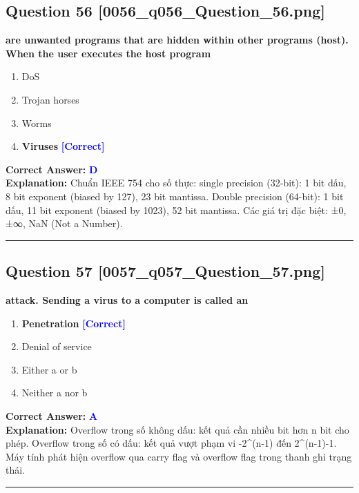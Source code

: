 \documentclass[11pt,a4paper]{article}
\begin{document}
\begin{minipage}{\textwidth}
\subsection*{Question 56 \quad \footnotesize{[0056\_q056\_Question\_56.png]}}
\noindent \textbf{are unwanted programs that are hidden within other programs (host). When the user executes the host program}

\begin{enumerate}[label=\Alph*.]
    \item DoS
    \item Trojan horses
    \item Worms
    \item \textbf{Viruses} \hfill \textcolor{blue}{\textbf{[Correct]}}
\end{enumerate}

\noindent \textbf{Correct Answer:} \textcolor{blue}{\textbf{D}} \\[2pt]
\noindent \textbf{Explanation:} Chuẩn IEEE 754 cho số thực: single precision (32-bit): 1 bit dấu, 8 bit exponent (biased by 127), 23 bit mantissa. Double precision (64-bit): 1 bit dấu, 11 bit exponent (biased by 1023), 52 bit mantissa. Các giá trị đặc biệt: ±0, ±∞, NaN (Not a Number).

\par\vspace{0.3cm}
\hrule
\vspace{0.3cm}
\end{minipage}

\begin{minipage}{\textwidth}
\subsection*{Question 57 \quad \footnotesize{[0057\_q057\_Question\_57.png]}}
\noindent \textbf{attack. Sending a virus to a computer is called an}

\begin{enumerate}[label=\Alph*.]
    \item \textbf{Penetration} \hfill \textcolor{blue}{\textbf{[Correct]}}
    \item Denial of service
    \item Either a or b
    \item Neither a nor b
\end{enumerate}

\noindent \textbf{Correct Answer:} \textcolor{blue}{\textbf{A}} \\[2pt]
\noindent \textbf{Explanation:} Overflow trong số không dấu: kết quả cần nhiều bit hơn n bit cho phép. Overflow trong số có dấu: kết quả vượt phạm vi -2\textasciicircum{}(n-1) đến 2\textasciicircum{}(n-1)-1. Máy tính phát hiện overflow qua carry flag và overflow flag trong thanh ghi trạng thái.

\par\vspace{0.3cm}
\hrule
\vspace{0.3cm}
\end{minipage}
\end{document}

